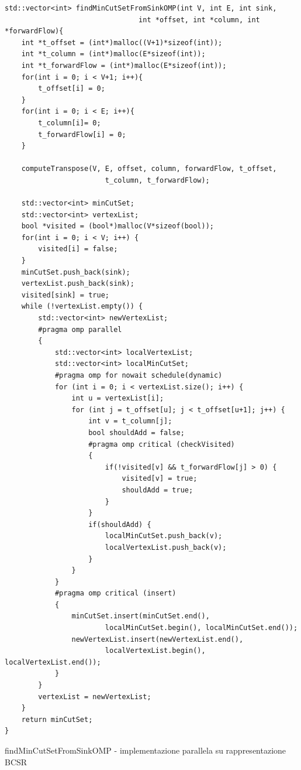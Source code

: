        \begin{listing}
        \begin{verbatim}
std::vector<int> findMinCutSetFromSinkOMP(int V, int E, int sink, 
                                int *offset, int *column, int *forwardFlow){
    int *t_offset = (int*)malloc((V+1)*sizeof(int));
    int *t_column = (int*)malloc(E*sizeof(int));
    int *t_forwardFlow = (int*)malloc(E*sizeof(int));
    for(int i = 0; i < V+1; i++){
        t_offset[i] = 0;
    }
    for(int i = 0; i < E; i++){
        t_column[i]= 0;
        t_forwardFlow[i] = 0;
    }
    
    computeTranspose(V, E, offset, column, forwardFlow, t_offset, 
                        t_column, t_forwardFlow);
    
    std::vector<int> minCutSet;
    std::vector<int> vertexList;
    bool *visited = (bool*)malloc(V*sizeof(bool));
    for(int i = 0; i < V; i++) {
        visited[i] = false;
    }
    minCutSet.push_back(sink);
    vertexList.push_back(sink);
    visited[sink] = true;
    while (!vertexList.empty()) {
        std::vector<int> newVertexList;      
        #pragma omp parallel
        {
            std::vector<int> localVertexList;
            std::vector<int> localMinCutSet;   
            #pragma omp for nowait schedule(dynamic)
            for (int i = 0; i < vertexList.size(); i++) {
                int u = vertexList[i];            
                for (int j = t_offset[u]; j < t_offset[u+1]; j++) {
                    int v = t_column[j];
                    bool shouldAdd = false;
                    #pragma omp critical (checkVisited)
                    {
                        if(!visited[v] && t_forwardFlow[j] > 0) {
                            visited[v] = true;
                            shouldAdd = true;
                        }
                    }   
                    if(shouldAdd) {
                        localMinCutSet.push_back(v);
                        localVertexList.push_back(v);
                    }
                }
            }
            #pragma omp critical (insert)
            {
                minCutSet.insert(minCutSet.end(), 
                        localMinCutSet.begin(), localMinCutSet.end());
                newVertexList.insert(newVertexList.end(), 
                        localVertexList.begin(), localVertexList.end());
            }
        }
        vertexList = newVertexList;
    }
    return minCutSet;
}
        \end{verbatim}
        \caption{findMinCutSetFromSinkOMP - implementazione parallela su rappresentazione BCSR}\label{code:mincut-parallel-bcsr}
        \end{listing}
    
